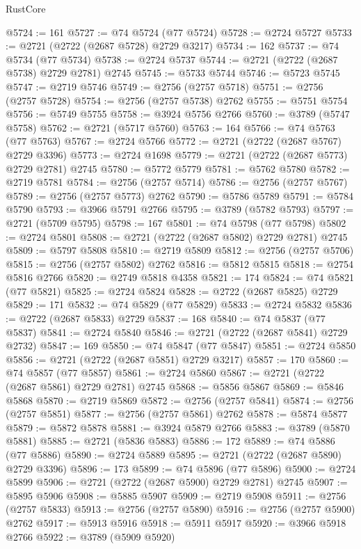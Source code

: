 \begin{lexlean}{RustCore}
\begin{coremodule}
@5724 := 161
@5727 := @74 @5724 (@77 @5724)
@5728 := @2724 @5727
@5733 := @2721 (@2722 (@2687 @5728) @2729 @3217)
@5734 := 162
@5737 := @74 @5734 (@77 @5734)
@5738 := @2724 @5737
@5744 := @2721 (@2722 (@2687 @5738) @2729 @2781) @2745
@5745 := @5733 @5744
@5746 := @5723 @5745
@5747 := @2719 @5746
@5749 := @2756 (@2757 @5718)
@5751 := @2756 (@2757 @5728)
@5754 := @2756 (@2757 @5738) @2762
@5755 := @5751 @5754
@5756 := @5749 @5755
@5758 := @3924 @5756 @2766
@5760 := @3789 (@5747 @5758)
@5762 := @2721 (@5717 @5760)
@5763 := 164
@5766 := @74 @5763 (@77 @5763)
@5767 := @2724 @5766
@5772 := @2721 (@2722 (@2687 @5767) @2729 @3396)
@5773 := @2724 @1698
@5779 := @2721 (@2722 (@2687 @5773) @2729 @2781) @2745
@5780 := @5772 @5779
@5781 := @5762 @5780
@5782 := @2719 @5781
@5784 := @2756 (@2757 @5714)
@5786 := @2756 (@2757 @5767)
@5789 := @2756 (@2757 @5773) @2762
@5790 := @5786 @5789
@5791 := @5784 @5790
@5793 := @3966 @5791 @2766
@5795 := @3789 (@5782 @5793)
@5797 := @2721 (@5709 @5795)
@5798 := 167
@5801 := @74 @5798 (@77 @5798)
@5802 := @2724 @5801
@5808 := @2721 (@2722 (@2687 @5802) @2729 @2781) @2745
@5809 := @5797 @5808
@5810 := @2719 @5809
@5812 := @2756 (@2757 @5706)
@5815 := @2756 (@2757 @5802) @2762
@5816 := @5812 @5815
@5818 := @2754 @5816 @2766
@5820 := @2749 @5818 @4358
@5821 := 174
@5824 := @74 @5821 (@77 @5821)
@5825 := @2724 @5824
@5828 := @2722 (@2687 @5825) @2729
@5829 := 171
@5832 := @74 @5829 (@77 @5829)
@5833 := @2724 @5832
@5836 := @2722 (@2687 @5833) @2729
@5837 := 168
@5840 := @74 @5837 (@77 @5837)
@5841 := @2724 @5840
@5846 := @2721 (@2722 (@2687 @5841) @2729 @2732)
@5847 := 169
@5850 := @74 @5847 (@77 @5847)
@5851 := @2724 @5850
@5856 := @2721 (@2722 (@2687 @5851) @2729 @3217)
@5857 := 170
@5860 := @74 @5857 (@77 @5857)
@5861 := @2724 @5860
@5867 := @2721 (@2722 (@2687 @5861) @2729 @2781) @2745
@5868 := @5856 @5867
@5869 := @5846 @5868
@5870 := @2719 @5869
@5872 := @2756 (@2757 @5841)
@5874 := @2756 (@2757 @5851)
@5877 := @2756 (@2757 @5861) @2762
@5878 := @5874 @5877
@5879 := @5872 @5878
@5881 := @3924 @5879 @2766
@5883 := @3789 (@5870 @5881)
@5885 := @2721 (@5836 @5883)
@5886 := 172
@5889 := @74 @5886 (@77 @5886)
@5890 := @2724 @5889
@5895 := @2721 (@2722 (@2687 @5890) @2729 @3396)
@5896 := 173
@5899 := @74 @5896 (@77 @5896)
@5900 := @2724 @5899
@5906 := @2721 (@2722 (@2687 @5900) @2729 @2781) @2745
@5907 := @5895 @5906
@5908 := @5885 @5907
@5909 := @2719 @5908
@5911 := @2756 (@2757 @5833)
@5913 := @2756 (@2757 @5890)
@5916 := @2756 (@2757 @5900) @2762
@5917 := @5913 @5916
@5918 := @5911 @5917
@5920 := @3966 @5918 @2766
@5922 := @3789 (@5909 @5920)

\end{coremodule}
\end{lexlean}
